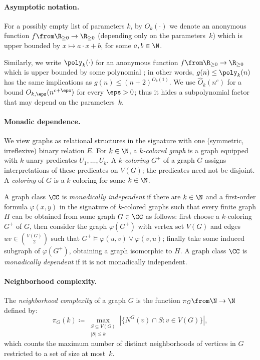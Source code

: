 \paragraph{Asymptotic notation.}
For a possibly empty list of parameters $k$,
 by $O_k(\cdot)$ we denote
 an anonymous function $f\from \R_{\ge 0}\to \R_{\ge 0}$ (depending only on the parameters~$k$) which is upper bounded by $x\mapsto a\cdot x+b$, for some $a,b\in\N$.

Similarly, we write $\poly_k(\cdot)$ for an anonymous function $f\from \R_{\ge 0}\to \R_{\ge 0}$ which is upper bounded by some polynomial%
;
in other words, $g(n)\le \poly_k(n)$ has the same implications as $g(n)\le (n+2)^{O_k(1)}$.
We use $\widehat O_k(n^c)$ for a bound $O_{k,\eps}(n^{c+\eps})$ for every $\eps>0$; thus it hides a subpolynomial factor that may depend on the parameters~$k$.

\paragraph{Monadic dependence.} We view graphs as relational structures in the signature with one (symmetric, irreflexive) binary relation $E$.
For $k\in\N$, a \emph{$k$-colored graph} is a graph equipped with $k$ unary predicates $U_1,\ldots,U_k$.
A \emph{$k$-coloring} $G^+$ of a graph $G$ assigns interpretations of these predicates on $V(G)$; the predicates need not be disjoint.
A \emph{coloring} of $G$ is a $k$-coloring for some $k\in\N$.

A graph class $\CC$ is \emph{monadically independent} if there are $k\in\N$ and a first-order formula $\varphi(x,y)$ in the signature of $k$-colored graphs such that  every finite graph $H$ can be obtained from some graph $G\in\CC$ as follows: first choose a $k$-coloring $G^+$ of $G$, then consider the graph $\varphi(G^+)$ with vertex set $V(G)$ and edges $uv\in\binom{V(G)}2$ such that $G^+\models\varphi(u,v)\vee\varphi(v,u)$; finally take some induced subgraph of $\varphi(G^+)$, obtaining a graph isomorphic to $H$.
A graph class $\CC$ is \emph{monadically dependent} if it is not monadically independent.

\paragraph{Neighborhood complexity.}
The \emph{neighborhood complexity} of a graph $G$ is the function $\pi_G\from\N\to\N$ defined by:
\[
    \pi_G(k) \coloneqq
    \max_{\substack{S\subseteq V(G)\\|S|\le k}}
    \left|\{N^G(v)\cap S:v\in V(G)\}\right|,
\]
 which counts the maximum number of distinct neighborhoods of vertices in $G$ restricted to a set of size at most~$k$.

